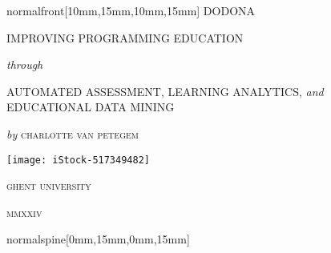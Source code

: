 \documentclass[coverheight=240mm,coverwidth=170mm,spinewidth=15mm]{bookcover}
\begin{document}
\begin{bookcover}
    \begin{bookcoverelement}{normal}{front}[10mm,15mm,10mm,15mm]%
        \centering
        \fontsize{34pt}{44pt}\selectfont DODONA \par
        \vspace*{-0.5cm} \par
         \par
        \vspace*{0.1cm} \par
        \fontsize{30pt}{34pt}\selectfont IMPROVING PROGRAMMING EDUCATION \par
        \textit{\fontsize{20pt}{23pt}\selectfont through} \par
        \vspace*{0.3cm}
        \fontsize{20pt}{25pt}\selectfont AUTOMATED ASSESSMENT, LEARNING ANALYTICS, \textit{\fontsize{20pt}{23pt}\selectfont and} EDUCATIONAL DATA MINING \par
        \vspace*{1.5cm}
        \fontsize{20pt}{23pt}\selectfont\textit{\fontsize{15pt}{23pt}\selectfont by} \textsc{charlotte van petegem} \par
        \vspace*{\fill}
        \texttt{[image: iStock-517349482]} \par
        \vspace*{\fill}
        \fontsize{15pt}{18pt}\selectfont\textsc{ghent university} \par
        \fontsize{12pt}{15pt}\selectfont\textsc{mmxxiv}
    \end{bookcoverelement}
    \begin{bookcoverelement}{normal}{spine}[0mm,15mm,0mm,15mm]%
        \centering
         \par
        \vspace*{\fill}
    \end{bookcoverelement}
%

\end{bookcover}
\end{document}
